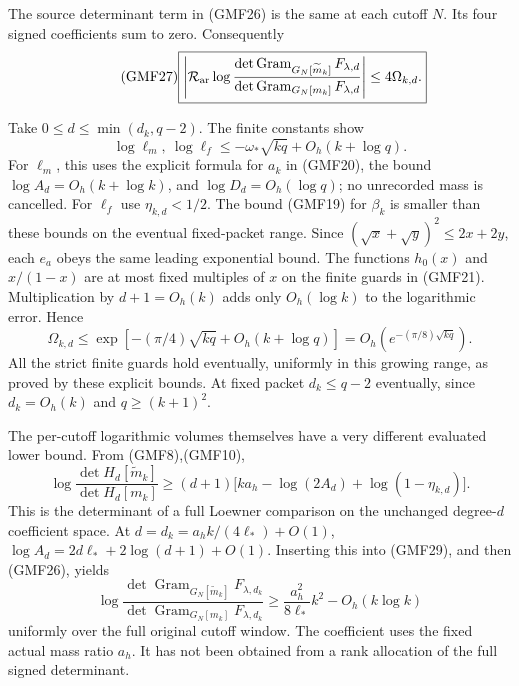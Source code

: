 \documentclass[11pt]{article}
\DeclareMathOperator{\Gram}{Gram}
\begin{document}
The source determinant term in (GMF26) is the same at
each cutoff \(N\).  Its four signed coefficients sum to zero.
Consequently
\begin{equation}\tag{GMF27}
 \boxed{
 \left|\mathcal R_{\rm ar}
 \log\frac{\det\Gram_{G_N[\widetilde m_k]}F_{\lambda,d}}
              {\det\Gram_{G_N[m_k]}F_{\lambda,d}}
 \right|\le4\Omega_{k,d}.}
\end{equation}

Take \(0\le d\le\min(d_k,q-2)\).
The finite constants show
\[
 \log\ell_m,\ \log\ell_f
 \le-\omega_*\sqrt{kq}+O_h(k+\log q).
\]
For \(\ell_m\), this uses the explicit formula for \(a_k\)
in (GMF20), the bound \(\log A_d=O_h(k+\log k)\), and
\(\log D_d=O_h(\log q)\); no unrecorded mass is cancelled.
For \(\ell_f\) use \(\eta_{k,d}<1/2\).
The bound (GMF19) for \(\beta_k\) is smaller than these
bounds on the eventual fixed-packet range.
Since \((\sqrt x+\sqrt y)^2\le2x+2y\), each \(e_a\) obeys
the same leading exponential bound.  The functions
\(h_0(x)\) and \(x/(1-x)\) are at most fixed multiples
of \(x\) on the finite guards in (GMF21).
Multiplication by \(d+1=O_h(k)\) adds only \(O_h(\log k)\)
to the logarithmic error.  Hence
\begin{equation}\tag{GMF28}
 \Omega_{k,d}\le
 \exp[-(\pi/4)\sqrt{kq}+O_h(k+\log q)]
 =O_h(e^{-(\pi/8)\sqrt{kq}}).
\end{equation}
All the strict finite guards hold eventually, uniformly in
this growing range, as proved by these explicit bounds.
At fixed packet \(d_k\le q-2\) eventually, since \(d_k=O_h(k)\)
and \(q\ge(k+1)^2\).

The per-cutoff logarithmic volumes themselves have a very
different evaluated lower bound.  From (GMF8),(GMF10),
\begin{equation}\tag{GMF29}
 \log\frac{\det H_d[\widetilde m_k]}{\det H_d[m_k]}
 \ge(d+1)\bigl[
 ka_h-\log(2A_d)+\log(1-\eta_{k,d})\bigr].
\end{equation}
This is the determinant of a full Loewner comparison on
the unchanged degree-\(d\) coefficient space.
At \(d=d_k=a_hk/(4\ell_*)+O(1)\),
\(\log A_d=2d\ell_*+2\log(d+1)+O(1)\).
Inserting this into (GMF29), and then (GMF26), yields
\begin{equation}\tag{GMF30}
 \boxed{
 \log\frac{\det\Gram_{G_N[\widetilde m_k]}F_{\lambda,d_k}}
              {\det\Gram_{G_N[m_k]}F_{\lambda,d_k}}
 \ge\frac{a_h^2}{8\ell_*}k^2-O_h(k\log k)}
\end{equation}
uniformly over the full original cutoff window.
The coefficient uses the fixed actual mass ratio \(a_h\).
It has not been obtained from a rank allocation of the
full signed determinant.
\end{document}
